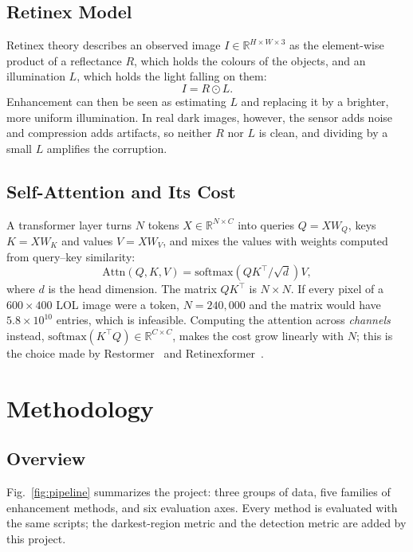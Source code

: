 \documentclass[journal]{IEEEtran}
\begin{document}
\subsection{Retinex Model}
Retinex theory describes an observed image $I\in\mathbb{R}^{H\times W\times 3}$ as the element-wise product of a
reflectance $R$, which holds the colours of the objects, and an illumination $L$, which holds the light falling on
them:
\begin{equation}
I = R \odot L. \label{eq:retinex}
\end{equation}
Enhancement can then be seen as estimating $L$ and replacing it by a brighter, more uniform illumination. In real
dark images, however, the sensor adds noise and compression adds artifacts, so neither $R$ nor $L$ is clean, and
dividing by a small $L$ amplifies the corruption.

\subsection{Self-Attention and Its Cost}
A transformer layer turns $N$ tokens $X\in\mathbb{R}^{N\times C}$ into queries $Q=XW_Q$, keys $K=XW_K$ and values
$V=XW_V$, and mixes the values with weights computed from query--key similarity:
\begin{equation}
\mathrm{Attn}(Q,K,V)=\mathrm{softmax}\!\left(QK^{\top}/\sqrt{d}\right)V, \label{eq:attn}
\end{equation}
where $d$ is the head dimension. The matrix $QK^{\top}$ is $N\times N$. If every pixel of a $600\times400$ LOL image
were a token, $N=240{,}000$ and the matrix would have $5.8\times10^{10}$ entries, which is infeasible. Computing the
attention across \emph{channels} instead, $\mathrm{softmax}(K^{\top}Q)\in\mathbb{R}^{C\times C}$, makes the cost grow
linearly with $N$; this is the choice made by Restormer~\cite{zamir2022restormer} and Retinexformer~\cite{cai2023retinexformer}.

\section{Methodology}\label{sec:method}
\subsection{Overview}
Fig.~\ref{fig:pipeline} summarizes the project: three groups of data, five families of enhancement methods, and six
evaluation axes. Every method is evaluated with the same scripts; the darkest-region metric and the detection metric
are added by this project.
\end{document}
